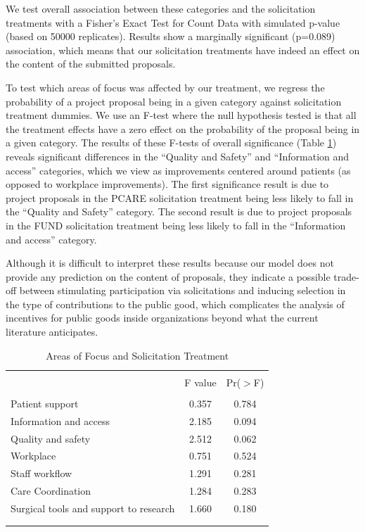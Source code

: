 \documentclass[12pt, titlepage]{article}
\begin{document}
We test overall association between these categories and the
solicitation treatments with a Fisher's Exact Test for Count Data with
simulated p-value (based on 50000 replicates). Results show a marginally
significant (p=0.089) association, which means that our solicitation
treatments have indeed an effect on the content of the submitted
proposals.

To test which areas of focus was affected by our treatment, we regress
the probability of a project proposal being in a given category against
solicitation treatment dummies. We use an F-test where the null
hypothesis tested is that all the treatment effects have a zero effect
on the probability of the proposal being in a given category. The
results of these F-tests of overall significance (Table
\ref{areas of focus}) reveals significant differences in the ``Quality
and Safety'' and ``Information and access'' categories, which we view as
improvements centered around patients (as opposed to workplace
improvements). The first significance result is due to project proposals
in the PCARE solicitation treatment being less likely to fall in the
``Quality and Safety'' category. The second result is due to project
proposals in the FUND solicitation treatment being less likely to fall
in the ``Information and access'' category.

Although it is difficult to interpret these results because our model
does not provide any prediction on the content of proposals, they
indicate a possible trade-off between stimulating participation via
solicitations and inducing selection in the type of contributions to the
public good, which complicates the analysis of incentives for public
goods inside organizations beyond what the current literature
anticipates.

\begin{table}
\centering
\caption{Areas of Focus and Solicitation Treatment}
\label{areas of focus}
\begin{tabular}{@{}lcc}
  \\[-1.8ex]\hline \hline \\[-1.8ex]
 & F value & Pr($>$F) \\ 
  \hline \\[-1.86ex]
Patient support & 0.357 & 0.784 \\ 
  Information and access & 2.185 & 0.094 \\ 
  Quality and safety  & 2.512 & 0.062 \\ 
  Workplace & 0.751 & 0.524 \\ 
  Staff workflow & 1.291 & 0.281 \\ 
  Care Coordination & 1.284 & 0.283 \\ 
  Surgical tools and support to research & 1.660 & 0.180 \\ 
   \\[-1.8ex]\hline \hline \\[-1.8ex]
\end{tabular}
\end{table}
\end{document}
